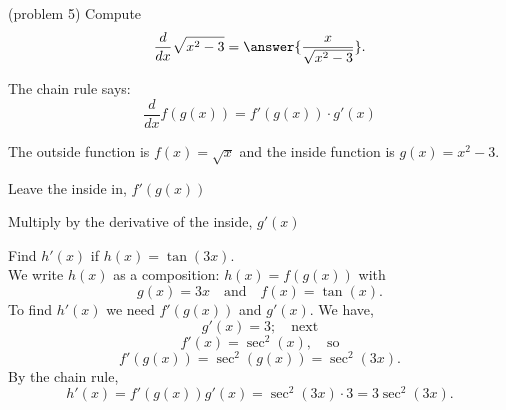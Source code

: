 \documentclass{ximera}
\begin{document}
\begin{center}
\begin{foldable}
\end{foldable}
\end{center}



\begin{problem}(problem 5)
  Compute
  \[
  \frac{d}{dx} \sqrt{x^2 - 3} = \answer{\frac{x}{\sqrt{x^2 - 3}}}.
  \]
  
    \begin{hint}
      The chain rule says:
      \[
      \frac{d}{dx} f(g(x)) = f'(g(x))\cdot g'(x)
      \]
    \end{hint}
    \begin{hint}
      The outside function is $f(x) = \sqrt{x}$ and the inside
      function is $g(x) = x^2 - 3$.
    \end{hint}
    
    \begin{hint}
		  Leave the inside in, $f'(g(x))$
		\end{hint}
		\begin{hint}
		  Multiply by the derivative of the inside, $g'(x)$
		\end{hint}
		
\end{problem}




\begin{example}[example 6]

Find $h'(x)$ if $h(x) = \tan(3x)$.\\
We write $h(x)$ as a composition: $h(x)=f(g(x))$ with 
\[
g(x) = 3x  \quad \text{and} \quad  f(x) =\tan(x).
\]
To find $h'(x)$ we need $f'(g(x))$ and $g'(x)$.  We have, 
\[
g'(x) =3; \quad \text{next} 
\]
\[
f'(x) =\sec^2(x) , \quad \text{so}
\]
\[
f'(g(x)) = \sec^2(g(x)) = \sec^2(3x).
\]
By the chain rule, 
\[
h'(x) = f'(g(x))g'(x) = \sec^2(3x) \cdot 3= 3\sec^2(3x).
\]
\end{example}


\begin{center}
\begin{foldable}
\end{foldable}
\end{center}
\end{document}
